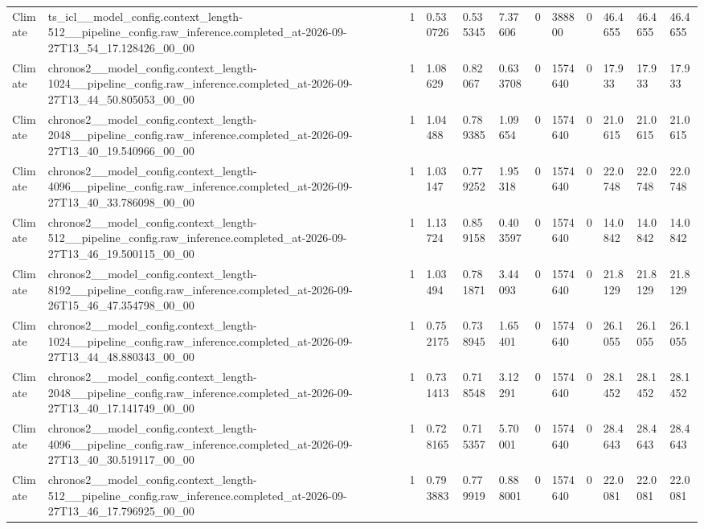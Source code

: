 \begin{tabular}{llllllllllll}
Climate & ts\_icl\_\_model\_config.context\_length-512\_\_pipeline\_config.raw\_inference.completed\_at-2026-09-27T13\_54\_17.128426\_00\_00 & 1 & 0.530726 & 0.535345 & 7.37606 & 0 & 388800 & 0 & 46.4655 & 46.4655 & 46.4655 \\
Climate & chronos2\_\_model\_config.context\_length-1024\_\_pipeline\_config.raw\_inference.completed\_at-2026-09-27T13\_44\_50.805053\_00\_00 & 1 & 1.08629 & 0.82067 & 0.633708 & 0 & 1574640 & 0 & 17.933 & 17.933 & 17.933 \\
Climate & chronos2\_\_model\_config.context\_length-2048\_\_pipeline\_config.raw\_inference.completed\_at-2026-09-27T13\_40\_19.540966\_00\_00 & 1 & 1.04488 & 0.789385 & 1.09654 & 0 & 1574640 & 0 & 21.0615 & 21.0615 & 21.0615 \\
Climate & chronos2\_\_model\_config.context\_length-4096\_\_pipeline\_config.raw\_inference.completed\_at-2026-09-27T13\_40\_33.786098\_00\_00 & 1 & 1.03147 & 0.779252 & 1.95318 & 0 & 1574640 & 0 & 22.0748 & 22.0748 & 22.0748 \\
Climate & chronos2\_\_model\_config.context\_length-512\_\_pipeline\_config.raw\_inference.completed\_at-2026-09-27T13\_46\_19.500115\_00\_00 & 1 & 1.13724 & 0.859158 & 0.403597 & 0 & 1574640 & 0 & 14.0842 & 14.0842 & 14.0842 \\
Climate & chronos2\_\_model\_config.context\_length-8192\_\_pipeline\_config.raw\_inference.completed\_at-2026-09-26T15\_46\_47.354798\_00\_00 & 1 & 1.03494 & 0.781871 & 3.44093 & 0 & 1574640 & 0 & 21.8129 & 21.8129 & 21.8129 \\
Climate & chronos2\_\_model\_config.context\_length-1024\_\_pipeline\_config.raw\_inference.completed\_at-2026-09-27T13\_44\_48.880343\_00\_00 & 1 & 0.752175 & 0.738945 & 1.65401 & 0 & 1574640 & 0 & 26.1055 & 26.1055 & 26.1055 \\
Climate & chronos2\_\_model\_config.context\_length-2048\_\_pipeline\_config.raw\_inference.completed\_at-2026-09-27T13\_40\_17.141749\_00\_00 & 1 & 0.731413 & 0.718548 & 3.12291 & 0 & 1574640 & 0 & 28.1452 & 28.1452 & 28.1452 \\
Climate & chronos2\_\_model\_config.context\_length-4096\_\_pipeline\_config.raw\_inference.completed\_at-2026-09-27T13\_40\_30.519117\_00\_00 & 1 & 0.728165 & 0.715357 & 5.70001 & 0 & 1574640 & 0 & 28.4643 & 28.4643 & 28.4643 \\
Climate & chronos2\_\_model\_config.context\_length-512\_\_pipeline\_config.raw\_inference.completed\_at-2026-09-27T13\_46\_17.796925\_00\_00 & 1 & 0.793883 & 0.779919 & 0.888001 & 0 & 1574640 & 0 & 22.0081 & 22.0081 & 22.0081 \\

\end{tabular}
